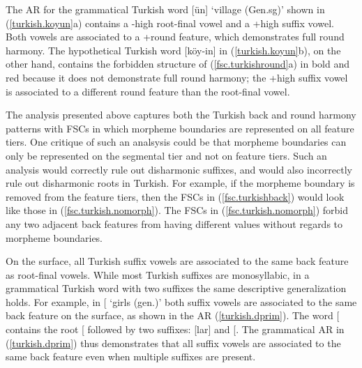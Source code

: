 \documentclass[,doc,floatsintext]{apa6}
\theoremstyle{definition}
\theoremstyle{definition}
\theoremstyle{definition}
\theoremstyle{remark}
\begin{document}
\noindent The AR for the grammatical Turkish word
{[}ün{]} `village (Gen.sg)' shown in
(\ref{turkish.koyun}a) contains a -high root-final vowel and a +high
suffix vowel. Both vowels are associated to a +round feature, which
demonstrates full round harmony. The hypothetical Turkish word
{[}köy-in{]} in (\ref{turkish.koyun}b), on the other hand, contains the
forbidden structure of (\ref{fsc.turkishround}a) in bold and red because
it does not demonstrate full round harmony; the +high suffix vowel is
associated to a different round feature than the root-final vowel.

The analysis presented above captures both the Turkish back and round
harmony patterns with FSCs in which morpheme boundaries are represented
on all feature tiers. One critique of such an analsysis could be that
morpheme boundaries can only be represented on the segmental tier and
not on feature tiers. Such an analysis would correctly rule out
disharmonic suffixes, and would also incorrectly rule out disharmonic
roots in Turkish. For example, if the morpheme boundary is removed from
the feature tiers, then the FSCs in (\ref{fsc.turkishback}) would look
like those in (\ref{fsc.turkish.nomorph}). The FSCs in
(\ref{fsc.turkish.nomorph}) forbid any two adjacent back features from
having different values without regards to morpheme boundaries.

\begin{exe}
\ex \label{fsc.turkish.nomorph}
\end{exe}

On the surface, all Turkish suffix vowels are associated to the same
back feature as root-final vowels. While most Turkish suffixes are
monosyllabic, in a grammatical Turkish word with two suffixes the same
descriptive generalization holds. For example, in
{[}\textipa{\LARGE+}\textipa{1n}{]}
`girls (gen.)' both suffix vowels are associated to the same back
feature on the surface, as shown in the AR (\ref{turkish.dprim}). The
word
{[}\textipa{\LARGE+}\textipa{1n}{]}
contains the root {[}\textipa{k1z}{]} followed by two suffixes:
{[}lar{]} and {[}\textipa{1n}{]}. The grammatical AR in
(\ref{turkish.dprim}) thus demonstrates that all suffix vowels are
associated to the same back feature even when multiple suffixes are
present.
\end{document}

